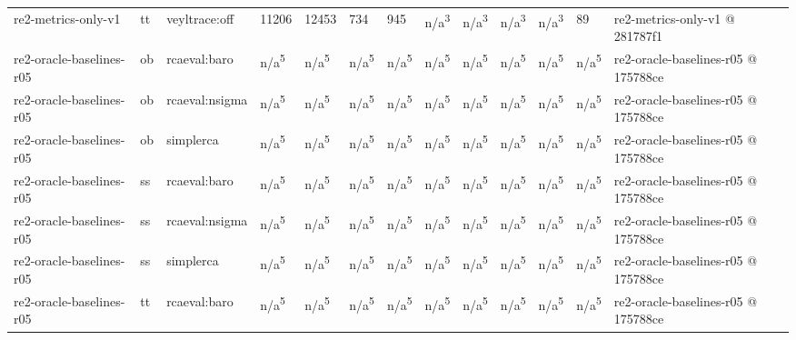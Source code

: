\begin{table}[t]
\begin{tabular}{lllllllllllll}
re2-metrics-only-v1 & tt & veyltrace:off & 11206 & 12453 & 734 & 945 & n/a\textsuperscript{3} & n/a\textsuperscript{3} & n/a\textsuperscript{3} & n/a\textsuperscript{3} & 89 & re2-metrics-only-v1 @ 281787f1 \\
re2-oracle-baselines-r05 & ob & rcaeval:baro & n/a\textsuperscript{5} & n/a\textsuperscript{5} & n/a\textsuperscript{5} & n/a\textsuperscript{5} & n/a\textsuperscript{5} & n/a\textsuperscript{5} & n/a\textsuperscript{5} & n/a\textsuperscript{5} & n/a\textsuperscript{5} & re2-oracle-baselines-r05 @ 175788ce \\
re2-oracle-baselines-r05 & ob & rcaeval:nsigma & n/a\textsuperscript{5} & n/a\textsuperscript{5} & n/a\textsuperscript{5} & n/a\textsuperscript{5} & n/a\textsuperscript{5} & n/a\textsuperscript{5} & n/a\textsuperscript{5} & n/a\textsuperscript{5} & n/a\textsuperscript{5} & re2-oracle-baselines-r05 @ 175788ce \\
re2-oracle-baselines-r05 & ob & simplerca & n/a\textsuperscript{5} & n/a\textsuperscript{5} & n/a\textsuperscript{5} & n/a\textsuperscript{5} & n/a\textsuperscript{5} & n/a\textsuperscript{5} & n/a\textsuperscript{5} & n/a\textsuperscript{5} & n/a\textsuperscript{5} & re2-oracle-baselines-r05 @ 175788ce \\
re2-oracle-baselines-r05 & ss & rcaeval:baro & n/a\textsuperscript{5} & n/a\textsuperscript{5} & n/a\textsuperscript{5} & n/a\textsuperscript{5} & n/a\textsuperscript{5} & n/a\textsuperscript{5} & n/a\textsuperscript{5} & n/a\textsuperscript{5} & n/a\textsuperscript{5} & re2-oracle-baselines-r05 @ 175788ce \\
re2-oracle-baselines-r05 & ss & rcaeval:nsigma & n/a\textsuperscript{5} & n/a\textsuperscript{5} & n/a\textsuperscript{5} & n/a\textsuperscript{5} & n/a\textsuperscript{5} & n/a\textsuperscript{5} & n/a\textsuperscript{5} & n/a\textsuperscript{5} & n/a\textsuperscript{5} & re2-oracle-baselines-r05 @ 175788ce \\
re2-oracle-baselines-r05 & ss & simplerca & n/a\textsuperscript{5} & n/a\textsuperscript{5} & n/a\textsuperscript{5} & n/a\textsuperscript{5} & n/a\textsuperscript{5} & n/a\textsuperscript{5} & n/a\textsuperscript{5} & n/a\textsuperscript{5} & n/a\textsuperscript{5} & re2-oracle-baselines-r05 @ 175788ce \\
re2-oracle-baselines-r05 & tt & rcaeval:baro & n/a\textsuperscript{5} & n/a\textsuperscript{5} & n/a\textsuperscript{5} & n/a\textsuperscript{5} & n/a\textsuperscript{5} & n/a\textsuperscript{5} & n/a\textsuperscript{5} & n/a\textsuperscript{5} & n/a\textsuperscript{5} & re2-oracle-baselines-r05 @ 175788ce \\

\end{tabular}
\end{table}
